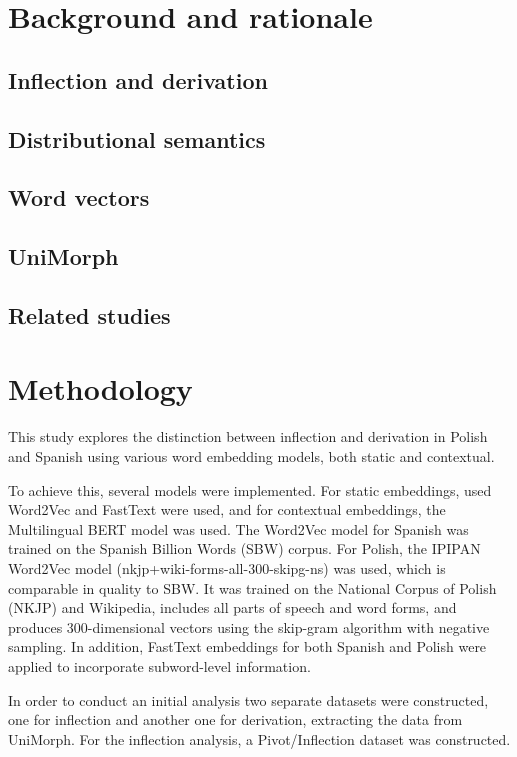 \documentclass[12pt]{article}
\begin{document}
\section{Background and rationale}

\subsection{Inflection and derivation}

\subsection{Distributional semantics}

\subsection{Word vectors}

\subsection{UniMorph}

\subsection{Related studies}

\section{Methodology}

This study explores the distinction between inflection and derivation in Polish and Spanish using various word embedding models, both static and contextual.

To achieve this, several models were implemented. For static embeddings, used Word2Vec and FastText were used, and for contextual embeddings, the Multilingual BERT model was used. The Word2Vec model for Spanish was trained on the Spanish Billion Words (SBW) corpus. For Polish, the IPIPAN Word2Vec model (nkjp+wiki-forms-all-300-skipg-ns) was used, which is comparable in quality to SBW. It was trained on the National Corpus of Polish (NKJP) and Wikipedia, includes all parts of speech and word forms, and produces 300-dimensional vectors using the skip-gram algorithm with negative sampling. In addition, FastText embeddings for both Spanish and Polish were applied to incorporate subword-level information.

In order to conduct an initial analysis two separate datasets were constructed, one for inflection and another one for derivation, extracting the data from UniMorph.
For the inflection analysis, a Pivot/Inflection dataset was constructed.
\end{document}
